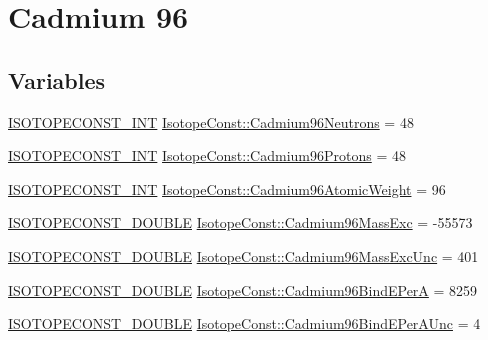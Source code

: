 \hypertarget{group___isotope_const-_cadmium-_cd96}{}\section{Cadmium 96}
\label{group___isotope_const-_cadmium-_cd96}
\subsection*{Variables}
\begin{DoxyCompactItemize}
\item 
\mbox{\hyperlink{group___isotope_const-_macros_ga5f18360b3e99483a35c32d789e62621c}{I\+S\+O\+T\+O\+P\+E\+C\+O\+N\+S\+T\+\_\+\+I\+NT}} \mbox{\hyperlink{group___isotope_const-_cadmium-_cd96_ga043b97266b21b38edf716acc4b9ef953}{Isotope\+Const\+::\+Cadmium96\+Neutrons}} = 48
\item 
\mbox{\hyperlink{group___isotope_const-_macros_ga5f18360b3e99483a35c32d789e62621c}{I\+S\+O\+T\+O\+P\+E\+C\+O\+N\+S\+T\+\_\+\+I\+NT}} \mbox{\hyperlink{group___isotope_const-_cadmium-_cd96_ga9882919b069d4c30cce9eb9a7bf963e5}{Isotope\+Const\+::\+Cadmium96\+Protons}} = 48
\item 
\mbox{\hyperlink{group___isotope_const-_macros_ga5f18360b3e99483a35c32d789e62621c}{I\+S\+O\+T\+O\+P\+E\+C\+O\+N\+S\+T\+\_\+\+I\+NT}} \mbox{\hyperlink{group___isotope_const-_cadmium-_cd96_gaa31f8c4c28974a240d0962e1073513c1}{Isotope\+Const\+::\+Cadmium96\+Atomic\+Weight}} = 96
\item 
\mbox{\hyperlink{group___isotope_const-_macros_ga8f45a7272ce02c0b4c65c44636ed719a}{I\+S\+O\+T\+O\+P\+E\+C\+O\+N\+S\+T\+\_\+\+D\+O\+U\+B\+LE}} \mbox{\hyperlink{group___isotope_const-_cadmium-_cd96_ga45b7a2f109ee2d2ed3d6bf7e5528b1cb}{Isotope\+Const\+::\+Cadmium96\+Mass\+Exc}} = -\/55573
\item 
\mbox{\hyperlink{group___isotope_const-_macros_ga8f45a7272ce02c0b4c65c44636ed719a}{I\+S\+O\+T\+O\+P\+E\+C\+O\+N\+S\+T\+\_\+\+D\+O\+U\+B\+LE}} \mbox{\hyperlink{group___isotope_const-_cadmium-_cd96_ga27834e53a70fff11e4189fd70db83f04}{Isotope\+Const\+::\+Cadmium96\+Mass\+Exc\+Unc}} = 401
\item 
\mbox{\hyperlink{group___isotope_const-_macros_ga8f45a7272ce02c0b4c65c44636ed719a}{I\+S\+O\+T\+O\+P\+E\+C\+O\+N\+S\+T\+\_\+\+D\+O\+U\+B\+LE}} \mbox{\hyperlink{group___isotope_const-_cadmium-_cd96_ga2c9bed1fa411c94c3ba2bdfa577999f5}{Isotope\+Const\+::\+Cadmium96\+Bind\+E\+PerA}} = 8259
\item 
\mbox{\hyperlink{group___isotope_const-_macros_ga8f45a7272ce02c0b4c65c44636ed719a}{I\+S\+O\+T\+O\+P\+E\+C\+O\+N\+S\+T\+\_\+\+D\+O\+U\+B\+LE}} \mbox{\hyperlink{group___isotope_const-_cadmium-_cd96_gaff9b18541ce60b33bf183de41e072977}{Isotope\+Const\+::\+Cadmium96\+Bind\+E\+Per\+A\+Unc}} = 4

\end{DoxyCompactItemize}
